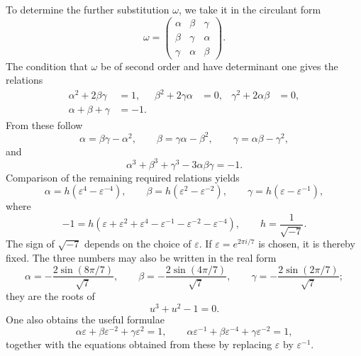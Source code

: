 \documentclass[11pt]{article}
\newcommand{\eps}{\varepsilon}
\newcommand{\mat}[1]{\begin{pmatrix}#1\end{pmatrix}}
\begin{document}
To determine the further substitution \(\omega\), we take it in the circulant form
\begin{equation}
\omega=\mat{\alpha&\beta&\gamma\\\beta&\gamma&\alpha\\\gamma&\alpha&\beta}.
\tag{3}
\end{equation}
The condition that \(\omega\) be of second order and have determinant one gives the relations
\begin{align}
\alpha^2+2\beta\gamma&=1,&
\beta^2+2\gamma\alpha&=0,&
\gamma^2+2\alpha\beta&=0,\tag{4}\\
\alpha+\beta+\gamma&=-1.\tag{5}
\end{align}
From these follow
\begin{equation}
\alpha=\beta\gamma-\alpha^2,
\qquad
\beta=\gamma\alpha-\beta^2,
\qquad
\gamma=\alpha\beta-\gamma^2,
\tag{6}
\end{equation}
and
\begin{equation}
\alpha^3+\beta^3+\gamma^3-3\alpha\beta\gamma=-1.
\tag{7}
\end{equation}
Comparison of the remaining required relations yields
\begin{equation}
\alpha=h(\eps^4-\eps^{-4}),\qquad
\beta=h(\eps^2-\eps^{-2}),\qquad
\gamma=h(\eps-\eps^{-1}),
\tag{8}
\end{equation}
where
\begin{equation}
-1=h(\eps+\eps^2+\eps^4-\eps^{-1}-\eps^{-2}-\eps^{-4}),
\qquad h=\frac1{\sqrt{-7}}.
\tag{9}
\end{equation}
The sign of \(\sqrt{-7}\) depends on the choice of \(\eps\). If \(\eps=e^{2\pi i/7}\) is chosen, it is thereby fixed. The three numbers may also be written in the real form
\begin{equation}
\alpha=-\frac{2\sin(8\pi/7)}{\sqrt7},
\qquad
\beta=-\frac{2\sin(4\pi/7)}{\sqrt7},
\qquad
\gamma=-\frac{2\sin(2\pi/7)}{\sqrt7};
\tag{10}
\end{equation}
they are the roots of
\begin{equation}
u^3+u^2-1=0.
\tag{11}
\end{equation}
One also obtains the useful formulae
\begin{equation}
\alpha\eps+\beta\eps^{-2}+\gamma\eps^{2}=1,
\qquad
\alpha\eps^{-1}+\beta\eps^{-4}+\gamma\eps^{-2}=1,
\tag{12}
\end{equation}
together with the equations obtained from these by replacing \(\eps\) by \(\eps^{-1}\).
\end{document}
